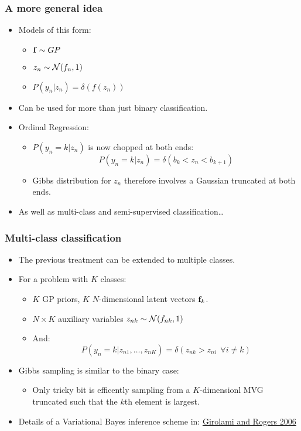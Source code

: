 \begin{frame}
	\frametitle{A more general idea}
	\begin{itemize}
		\item Models of this form:
		\begin{itemize}
			\item $\mathbf{f} \sim GP$
			\item $z_n\sim {\cal N}(f_n,1)$
			\item $P(y_n|z_n) = \delta(f(z_n))$
		\end{itemize}
		\item Can be used for more than just binary classification.
		\item<2-> Ordinal Regression:
			\begin{itemize}
				\item $P(y_n=k|z_n)$ is now chopped at both ends:
				\[
					P(y_n=k|z_n) = \delta(b_k<z_n<b_{k+1})
				\]
				\item Gibbs distribution for $z_n$ therefore involves a Gaussian truncated at both ends.
			\end{itemize}
		\item<3->As well as multi-class and semi-supervised classification\ldots
	\end{itemize}
\end{frame}


\begin{frame}
	\frametitle{Multi-class classification}
	\begin{itemize}
		\item The previous treatment can be extended to multiple classes.
		\item For a problem with $K$ classes:
		\begin{itemize}
			\item $K$ GP priors, $K$ $N$-dimensional latent vectors $\mathbf{f}_k$.
			\item $N\times K$ auxiliary variables $z_{nk} \sim {\cal N}(f_{nk},1)$
			\item And:
			\[
				P(y_n=k|z_{n1},\ldots,z_{nK}) = \delta(z_{nk}>z_{ni} ~~\forall i\neq k)
			\]
		\end{itemize}
		\item<2->Gibbs sampling is similar to the binary case:
			\begin{itemize}
				\item Only tricky bit is efficently sampling from a $K$-dimensionl \ac{MVG} truncated such that the $k$th element is largest.
			\end{itemize}
		\item<3->Details of a Variational Bayes inference scheme in: \href{http://www.mitpressjournals.org/doi/pdf/10.1162/neco.2006.18.8.1790}{Girolami and Rogers 2006}

	\end{itemize}

\end{frame}

